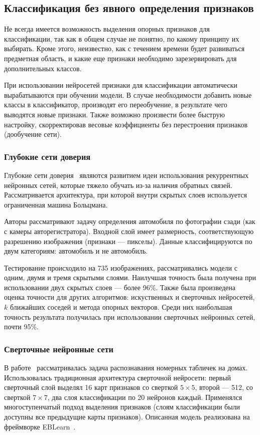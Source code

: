 \documentclass[a4paper,14pt]{extarticle} %
\begin{document}
\subsection{Классификация без явного определения признаков}
\hspace{\parindent} Не всегда имеется возможность выделения опорных признаков для классификации, так как в общем случае не понятно, по какому принципу их выбирать. Кроме этого, неизвестно, как с течением времени будет развиваться предметная область, и какие еще признаки необходимо зарезервировать для дополнительных классов. 

При использовании нейросетей признаки для классификации автоматически вырабатываются при обучении модели. В случае необходимости добавить новые классы в классификатор, производят его переобучение, в результате чего выводятся новые признаки. Также возможно произвести более быструю настройку, скорректировав весовые коэффициенты без перестроения признаков (дообучение сети).

\subsubsection{Глубокие сети доверия} 
\hspace{\parindent} Глубокие сети доверия~\cite{wang2014vehicle} являются развитием идеи использования рекуррентных нейронных сетей, которые тяжело обучать из-за наличия обратных связей. Рассматривается архитектура, при которой внутри скрытых слоев используется ограниченная машина Больцмана. 

Авторы рассматривают задачу определения автомобиля по фотографии сзади (как с камеры авторегистратора). Входной слой имеет размерность, соответствующую разрешению изображения (признаки --- пикселы). Данные классифицируются по двум категориям: автомобиль и не автомобиль.

Тестирование происходило на 735 изображениях, рассматривались модели с одним, двумя и тремя скрытыми слоями. Наилучшая точность была получена при использовании двух скрытых слоев --- более 96\%. Также была произведена оценка точности для других алгоритмов: искуственных и сверточных нейросетей, $k$ ближайших соседей и метода опорных векторов. Среди них наибольшая точность результата получилась при использовании сверточных нейронных сетей, почти 95\%.

\subsubsection{Сверточные нейронные сети}
\hspace{\parindent} В работе~\cite{sermanet2012convolutional} рассматривалась задача распознавания номерных табличек на домах. Использовалась традиционная архитектура сверточной нейросети: первый сверточный слой выделял 16 карт признаков со сверткой $5 \times 5$, второй --- 512, со сверткой $7 \times 7$, два слоя классификации по 20 нейронов каждый. Применялся многоступенчатый подход выделения признаков (слоям классификации были доступны все предыдущие карты признаков). Описанная модель реализована на фреймворке EBLearn~\cite{sermanet2009eblearn}.
\end{document}

